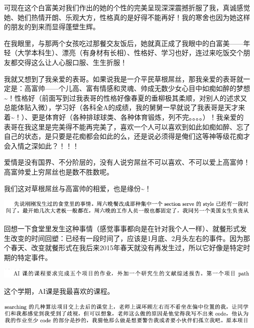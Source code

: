 \documentclass[9pt, b5paper]{article}
\begin{document}
可现在这个白富美对我们作出的她的个性的完美呈现深深震撼折服了我，真诚感觉她、她们热情开朗、乐观大方，性格真的是好得不能再好！我的寒舍也因为她这样的朋友的到来而显得蓬壁生辉。

在我眼里，与那两个女孩吃过那餐交友饭后，她就真正成了我眼中的白富美——年轻（大学本科生）、漂亮（有身材有长相）、性格好、学习也好，连过来吃饭交个朋友都交得这么让人心服口服、生生折服！

我就又想到了我亲爱的表哥。如果说我是一介平民草根屌丝，那我亲爱的表哥就一定是：高富帅——个儿高、富有情感和灵魂、帅成无数少女心目中如痴如醉的梦想\textasciitilde{}！性格好（前面写到过我表哥的性格好像春夏的垂柳极其柔顺，对别人的述求又总能体贴入微），学习好（各科全A的成绩，我的舅舅一早就说了我表哥是天才来着\textasciitilde{}！）、更是体育好（各种排球球类、各种体育锻炼，列不完。。。。）！我亲爱的表哥在我这里是完美得不能再完美了，喜欢一个人可以喜欢到如此如痴如醉、忘了自己的状态，是只要是花痴都会如此的么，还是说必须得是俺们这等神等级花痴才会入情之深如此？！！！

爱情是没有国界、不分阶层的，没有人说穷屌丝不可以喜欢、不可以爱上高富帅！高富帅爱上穷屌丝也是数不胜数呢。

我们这对草根屌丝与高富帅的相爱，也是缘份\textasciitilde{}！

\begin{center}
\includegraphics[width=.9\linewidth]{./pic/backups_plans_20210503_215802.png}
\end{center}

回想一下食堂里发生这种事情（感觉事事都向是在针对我个人一样）、就餐形式发生改变的时间回塑：已经有一段时间了，应该是1月底、2月头左右的事件。因为那个春天、改变就餐形式在我后来2015年春天就没有再发生过，所以它好像是特定时期的特定事件。 

\begin{center}
\includegraphics[width=.9\linewidth]{./pic/backups_plans_20210504_113259.png}
\end{center}

这个学期，AI课是我最喜欢的课程。

\begin{center}
\includegraphics[width=.9\linewidth]{./pic/backups_plans_20210504_113353.png}
\end{center}
\end{document}
